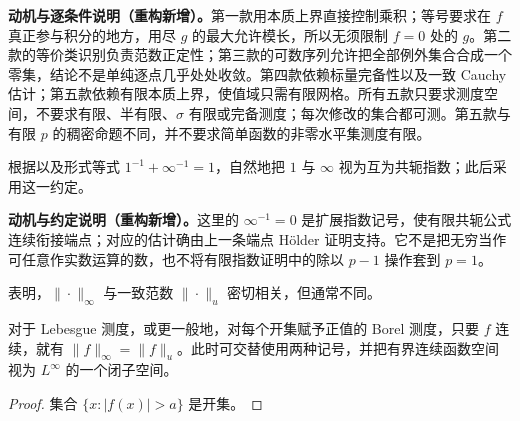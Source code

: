 \documentclass[../../main.tex]{subfiles}
\begin{document}
\begin{remark}
\textbf{动机与逐条件说明（重构新增）。}第一款用本质上界直接控制乘积；等号要求在 $f$ 真正参与积分的地方，用尽 $g$ 的最大允许模长，所以无须限制 $f=0$ 处的 $g$。第二款的等价类识别负责范数正定性；第三款的可数序列允许把全部例外集合合成一个零集，结论不是单纯逐点几乎处处收敛。第四款依赖标量完备性以及一致 Cauchy 估计；第五款依赖有限本质上界，使值域只需有限网格。所有五款只要求测度空间，不要求有限、半有限、$\sigma$ 有限或完备测度；每次修改的集合都可测。第五款与有限 $p$ 的稠密命题不同，并不要求简单函数的非零水平集测度有限。
\end{remark}
\begin{definition}[端点共轭指数]\label{definition:ch06-endpoint-conjugate}
根据以及形式等式 $1^{-1}+\infty^{-1}=1$，自然地把 $1$ 与 $\infty$ 视为互为共轭指数；此后采用这一约定。
\end{definition}
\begin{remark}
\textbf{动机与约定说明（重构新增）。}这里的 $\infty^{-1}=0$ 是扩展指数记号，使有限共轭公式连续衔接端点；对应的估计确由上一条端点 Hölder 证明支持。它不是把无穷当作可任意作实数运算的数，也不将有限指数证明中的除以 $p-1$ 操作套到 $p=1$。
\end{remark}
表明，$\|\cdot\|_\infty$ 与一致范数 $\|\cdot\|_u$ 密切相关，但通常不同。
\begin{proposition}\label{proposition:ch06-continuous-essential-supremum}
对于 Lebesgue 测度，或更一般地，对每个开集赋予正值的 Borel 测度，只要 $f$ 连续，就有 $\|f\|_\infty=\|f\|_u$。此时可交替使用两种记号，并把有界连续函数空间视为 $L^\infty$ 的一个闭子空间。
\end{proposition}
\begin{proof}
集合 $\{x:|f(x)|>a\}$ 是开集。
\end{proof}
\end{document}
